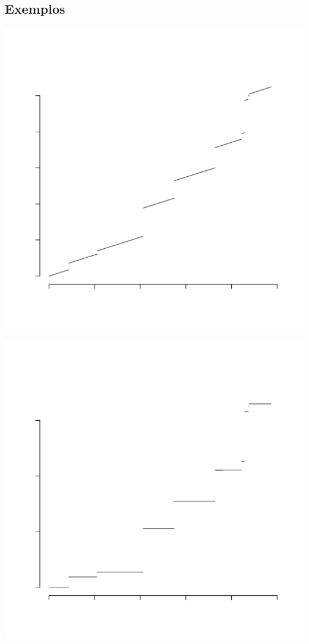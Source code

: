 \documentclass[xcolor=pdftex,dvipsnames]{beamer}
\begin{document}
\subsection{Exemplos}

\begin{frame}
  \begin{center}
    \includegraphics[width=\textwidth,trim=0cm 4.5cm 0cm 4.5cm]{gamma_c1}
  \end{center}
\end{frame}

\begin{frame}
  \begin{center}
    \includegraphics[width=\textwidth,trim=0cm 4.5cm 0cm 4.5cm]{gamma_c0}
  \end{center}
\end{frame}
\end{document}
